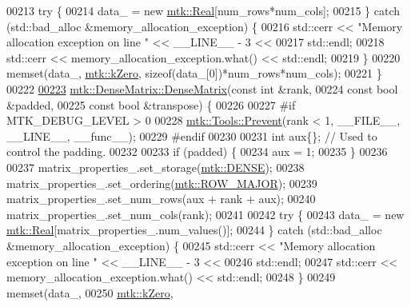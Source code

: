 \begin{DoxyCode}
00213   \textcolor{keywordflow}{try} \{
00214     data\_ = \textcolor{keyword}{new} \hyperlink{group__c01-roots_gac080bbbf5cbb5502c9f00405f894857d}{mtk::Real}[num\_rows*num\_cols];
00215   \} \textcolor{keywordflow}{catch} (std::bad\_alloc &memory\_allocation\_exception) \{
00216     std::cerr << \textcolor{stringliteral}{"Memory allocation exception on line "} << \_\_LINE\_\_ - 3 <<
00217       std::endl;
00218     std::cerr << memory\_allocation\_exception.what() << std::endl;
00219   \}
00220   memset(data\_, \hyperlink{group__c01-roots_ga59a451a5fae30d59649bcda274fea271}{mtk::kZero}, \textcolor{keyword}{sizeof}(data\_[0])*num\_rows*num\_cols);
00221 \}
00222 
\hypertarget{mtk__dense__matrix_8cc_source_l00223}{}\hyperlink{classmtk_1_1DenseMatrix_a4ef0dec1b5558fcf00719bfac059ec68}{00223} \hyperlink{classmtk_1_1DenseMatrix_a0c75ee704707983f935b02835eab0933}{mtk::DenseMatrix::DenseMatrix}(\textcolor{keyword}{const} \textcolor{keywordtype}{int} &rank,
00224                               \textcolor{keyword}{const} \textcolor{keywordtype}{bool} &padded,
00225                               \textcolor{keyword}{const} \textcolor{keywordtype}{bool} &transpose) \{
00226 
00227 \textcolor{preprocessor}{  #if MTK\_DEBUG\_LEVEL > 0}
00228   \hyperlink{classmtk_1_1Tools_afe5bb096309258e2e72503fd7b41c7e0}{mtk::Tools::Prevent}(rank < 1, \_\_FILE\_\_, \_\_LINE\_\_, \_\_func\_\_);
00229 \textcolor{preprocessor}{  #endif}
00230 
00231   \textcolor{keywordtype}{int} aux\{\};  \textcolor{comment}{// Used to control the padding.}
00232 
00233   \textcolor{keywordflow}{if} (padded) \{
00234     aux = 1;
00235   \}
00236 
00237   matrix\_properties\_.set\_storage(\hyperlink{namespacemtk_ga25b67ec6a2afeee69f9bb196a9c66619a00a806d43a7d74e9ccca47a2134e9c87}{mtk::DENSE});
00238   matrix\_properties\_.set\_ordering(\hyperlink{namespacemtk_ga622801bd9f912d0f976c3e383f5f581cabc55178ac16eb1ce89b5f3ab915a91f3}{mtk::ROW\_MAJOR});
00239   matrix\_properties\_.set\_num\_rows(aux + rank + aux);
00240   matrix\_properties\_.set\_num\_cols(rank);
00241 
00242   \textcolor{keywordflow}{try} \{
00243     data\_ = \textcolor{keyword}{new} \hyperlink{group__c01-roots_gac080bbbf5cbb5502c9f00405f894857d}{mtk::Real}[matrix\_properties\_.num\_values()];
00244   \} \textcolor{keywordflow}{catch} (std::bad\_alloc &memory\_allocation\_exception) \{
00245     std::cerr << \textcolor{stringliteral}{"Memory allocation exception on line "} << \_\_LINE\_\_ - 3 <<
00246       std::endl;
00247     std::cerr << memory\_allocation\_exception.what() << std::endl;
00248   \}
00249   memset(data\_,
00250          \hyperlink{group__c01-roots_ga59a451a5fae30d59649bcda274fea271}{mtk::kZero},

\end{DoxyCode}
